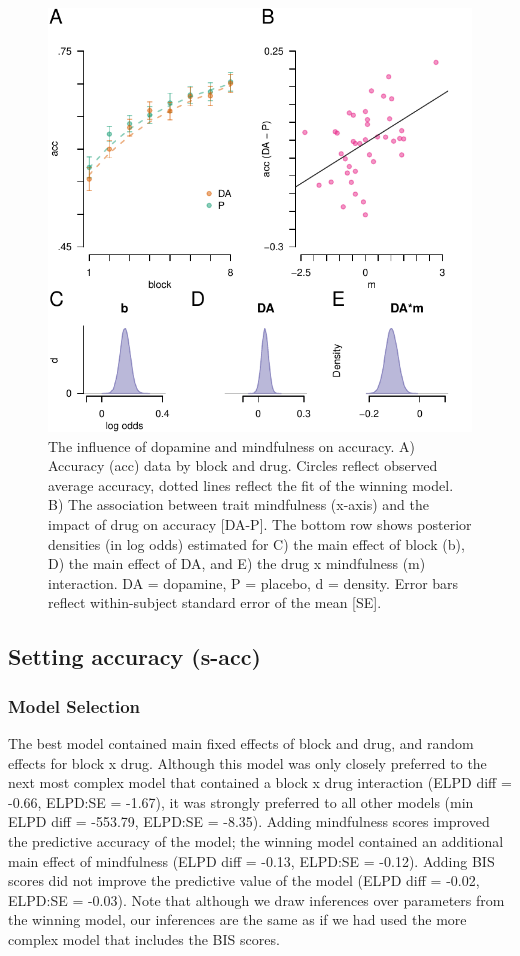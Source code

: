 \documentclass{article}
\begin{document}
\begin{figure}

{\centering \includegraphics[width=0.7\linewidth]{../../images/acc_fig} 

}

\caption{The influence of dopamine and mindfulness on accuracy. A) Accuracy (acc) data by block and drug. Circles reflect observed average accuracy, dotted lines reflect the fit of the winning model. B) The association between trait mindfulness (x-axis) and the impact of drug on accuracy [DA-P]. The bottom row shows posterior densities (in log odds) estimated for C) the main effect of block (b), D) the main effect of DA, and E) the drug x mindfulness (m) interaction. DA = dopamine, P = placebo, d = density. Error bars reflect within-subject standard error of the mean [SE].}\label{fig:accfig}
\end{figure}

\hypertarget{setting-accuracy-s-acc}{%
\subsection{Setting accuracy (s-acc)}\label{setting-accuracy-s-acc}}

\hypertarget{model-selection-1}{%
\subsubsection{Model Selection}\label{model-selection-1}}

The best model contained main fixed effects of block and drug, and
random effects for block x drug. Although this model was only closely
preferred to the next most complex model that contained a block x drug
interaction (ELPD diff = -0.66, ELPD:SE = -1.67), it was strongly
preferred to all other models (min ELPD diff = -553.79, ELPD:SE =
-8.35). Adding mindfulness scores improved the predictive accuracy of
the model; the winning model contained an additional main effect of
mindfulness (ELPD diff = -0.13, ELPD:SE = -0.12). Adding BIS scores did
not improve the predictive value of the model (ELPD diff = -0.02,
ELPD:SE = -0.03). Note that although we draw inferences over parameters
from the winning model, our inferences are the same as if we had used
the more complex model that includes the BIS scores.
\end{document}
